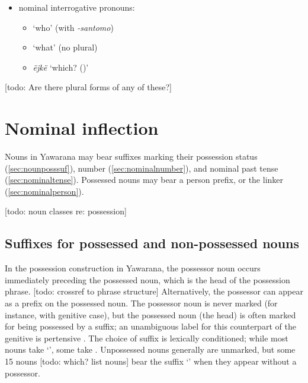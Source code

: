 \documentclass{memoir}
\begin{document}
\begin{itemize}
\tightlist
\item
  nominal interrogative pronouns:

  \begin{itemize}
  \tightlist
  \item
     `who' (with \emph{-santomo})
  \item
     `what' (no plural)
  \item
    \emph{ëjkë} `which? ()'
  \end{itemize}
\end{itemize}

{[}todo: Are there plural forms of any of these?{]}

\section{\texorpdfstring{Nominal inflection
\label{sec:nouninfl}}{Nominal inflection }}

Nouns in Yawarana may bear suffixes marking their possession status
(\cref{sec:nounposssuf}), number (\cref{sec:nominalnumber}), and nominal
past tense (\cref{sec:nominaltense}). Possessed nouns may bear a person
prefix, or the linker  (\cref{sec:nominalperson}).

{[}todo: noun classes re: possession{]}

\subsection{\texorpdfstring{Suffixes for possessed and non-possessed
nouns
\label{sec:nounposssuf}}{Suffixes for possessed and non-possessed nouns }}

In the possession construction in Yawarana, the possessor noun occurs
immediately preceding the possessed noun, which is the head of the
possession phrase. {[}todo: crossref to phrase structure{]}
Alternatively, the possessor can appear as a prefix on the possessed
noun. The possessor noun is never marked (for instance, with genitive
case), but the possessed noun (the head) is often marked for being
possessed by a suffix; an unambiguous label for this counterpart of the
genitive is pertensive \parencites{dixon2010basic}. The choice of suffix
is lexically conditioned; while most nouns take  `',
some take . Unpossessed nouns generally are unmarked, but some
15 nouns {[}todo: which? list nouns{]} bear the suffix 
`' when they appear without a possessor.
\end{document}
